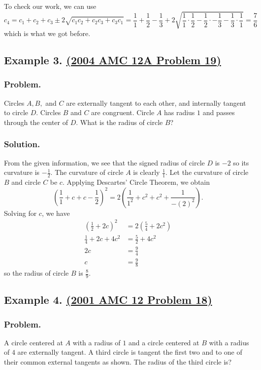 \documentclass{article}
\begin{document}
To check our work, we can use $$c_4=c_1+c_2+c_3\pm 2\sqrt{c_1c_2+c_2c_3+c_3c_1}=\frac11+\frac12-\frac13+2\sqrt{\frac11\cdot\frac12-\frac12\cdot-\frac13-\frac13\cdot\frac11}=\frac76$$ which is what we got before. 

\subsection{Example 3. \href{https://artofproblemsolving.com/community/c4h71749p416082}{(2004 AMC 12A Problem 19)}}
\subsubsection{Problem.}
Circles $A,B,$ and $C$ are externally tangent to each other, and internally tangent to circle $D$. Circles $B$ and $C$ are congruent. Circle $A$ has radius $1$ and passes through the center of $D$. What is the radius of circle $B$?
\subsubsection{Solution.}
From the given information, we see that the signed radius of circle $D$ is $-2$ so its curvature is $-\frac12$. The curvature of circle $A$ is clearly $\frac11$. Let the curvature of circle $B$ and circle $C$ be $c$. Applying Descartes' Circle Theorem, we obtain $$\left(\frac11+c+c-\frac12\right)^2=2\left(\frac{1}{1^2}+c^2+c^2+\frac{1}{-(2)^2}\right).$$  Solving for $c$, we have \begin{align*} \left(\frac12+2c\right)^2&=2\left(\frac54+2c^2\right)\\ \frac14+2c+4c^2&=\frac52+4c^2\\ 2c&=\frac94\\ c&=\frac98 \end{align*} so the radius of circle $B$ is $\frac89$. 

\subsection{Example 4. \href{https://artofproblemsolving.com/community/c4h64305p382541}{(2001 AMC 12 Problem 18)}}
\subsubsection{Problem.}
A circle centered at $A$ with a radius of $1$ and a circle centered at $B$ with a radius of $4$ are externally tangent. A third circle is tangent the first two and to one of their common external tangents as shown. The radius of the third circle is? 
\end{document}
